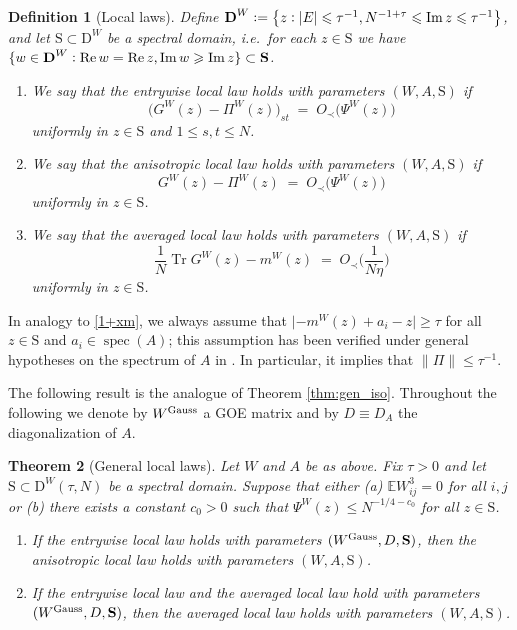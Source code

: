 \documentclass[11pt]{article} %
\numberwithin{equation}{section}
\numberwithin{figure}{section}
\theoremstyle{plain} %
\newtheorem{theorem}{Theorem}[section]
\newtheorem{definition}[theorem]{Definition}
\theoremstyle{definition} %
\newcommand{\f}[1]{\boldsymbol{\mathrm{#1}}} %
\newcommand{\txt}[1]{\text{\rm{#1}}}
\newcommand{\E}{\mathbb{E}}
\newcommand{\col}{\mathrel{\vcenter{\baselineskip0.75ex \lineskiplimit0pt \hbox{.}\hbox{.}}}}
\newcommand*{\deq}{\mathrel{\vcenter{\baselineskip0.65ex \lineskiplimit0pt \hbox{.}\hbox{.}}}=}
\renewcommand{\leq}{\leqslant}
\renewcommand{\geq}{\geqslant}
\newcommand{\pb}[1]{\bigl({#1}\bigr)}
\newcommand{\pbb}[1]{\biggl({#1}\biggr)}
\newcommand{\h}[1]{\{{#1}\}}
\newcommand{\hb}[1]{\bigl\{{#1}\bigr\}}
\newcommand{\abs}[1]{\lvert #1 \rvert}
\newcommand{\norm}[1]{\lVert #1 \rVert}
\DeclareMathOperator{\tr}{Tr}
\DeclareMathOperator{\re}{Re}
\DeclareMathOperator{\im}{Im}
\DeclareMathOperator{\spec}{spec}
\begin{document}
\begin{definition}[Local laws] \label{def:local_laws of Wigner} Define  $\f D^W \deq \hb{z \col \abs{E} \leq \tau^{-1} , N^{-1+\tau} \leq \im z \leq \tau^{-1}}$, and let $\f S \subset \f D^W$ be a spectral domain, i.e.\ for each $z \in \f S$ we have $\h{w \in \f D^W \col \re w = \re z, \im w \geq \im z} \subset \f S$.
\begin{enumerate}
\item\label{en}
We say that the \emph{entrywise local law holds with parameters $(W, A, \f S)$}  if
\begin{equation*}
\pb{G^W(z) - \Pi^W(z)}_{st} \;=\; O_\prec\pb{\Psi^W(z)}
\end{equation*}
uniformly in $z \in \f S$ and $1\leq s,t \leq N$.
\item
We say that the \emph{anisotropic local law holds with parameters $(W, A, \f S)$} if
\begin{equation*}
G^W(z) - \Pi^W(z) \;=\; O_\prec \pb{\Psi^W(z)}
\end{equation*}
uniformly in $z \in \f S$.
\item
We say that the \emph{averaged local law holds with parameters $(W, A, \f S)$} if
\begin{equation*}
\frac{1}{N} \tr G^W (z) - m^W(z) \;=\; O_\prec\pbb{\frac{1}{N \eta}}
\end{equation*}
uniformly in $z \in \f S$.
\end{enumerate}
\end{definition}

In analogy to \eqref{1+xm}, we always assume that
$\abs{-m^W(z) + a_i - z} \geq \tau$
for all $z \in \f S$ and $a_i \in \spec(A)$;
this assumption has been verified under general hypotheses on the spectrum of $A$ in \cite{LSY}. In particular, it implies that $\norm{\Pi} \leq \tau^{-1}$.


The following result is the analogue of Theorem \ref{thm:gen_iso}. Throughout the following we denote by $W^{\txt{Gauss}}$ a GOE matrix and by $D \equiv D_A$ the diagonalization of $A$.
\begin{theorem}[General local laws]\label{lem:general Wig}
Let $W$ and $A$ be as above. Fix $\tau > 0$ and let $\f S \subset \f D^W(\tau, N)$ be a spectral domain. Suppose that either (a) $\E W_{ij}^3=0$ for all $i,j$ or (b) there exists a constant $c_0 > 0$ such that $\Psi^W(z) \leq N^{-1/4-c_0}$ for all $z \in \f S$.
\begin{enumerate}
\item
If the entrywise local law holds with parameters $(W^{\txt{Gauss}}, D, \f S)$, then the anisotropic local law holds with parameters $(W, A, \f S)$.
\item
If the entrywise local law and the averaged local law hold with parameters $(W^{\txt{Gauss}}, D, \f S)$, then the averaged local law holds with parameters $(W, A, \f S) $.
\end{enumerate}
\end{theorem}
\end{document}
